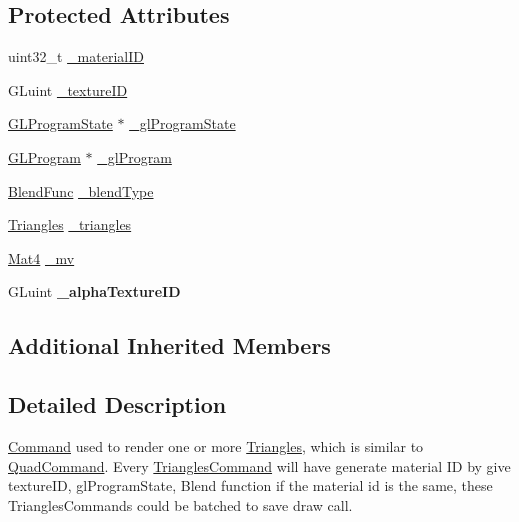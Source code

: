 \subsection*{Protected Attributes}
\begin{DoxyCompactItemize}
\item 
uint32\+\_\+t \hyperlink{classTrianglesCommand_a3f477ae91549ae4a58396ce892d79021}{\+\_\+material\+ID}
\item 
G\+Luint \hyperlink{classTrianglesCommand_ac3a181c96ba458f8d476b4f35266503a}{\+\_\+texture\+ID}
\item 
\hyperlink{classGLProgramState}{G\+L\+Program\+State} $\ast$ \hyperlink{classTrianglesCommand_a204f411f00ac6449b4540a9789c0956e}{\+\_\+gl\+Program\+State}
\item 
\hyperlink{classGLProgram}{G\+L\+Program} $\ast$ \hyperlink{classTrianglesCommand_aeea0d1064dcd2abdee34cd1673956188}{\+\_\+gl\+Program}
\item 
\hyperlink{structBlendFunc}{Blend\+Func} \hyperlink{classTrianglesCommand_abed08224f3a8d837e6fb2a37c2c1d786}{\+\_\+blend\+Type}
\item 
\hyperlink{structTrianglesCommand_1_1Triangles}{Triangles} \hyperlink{classTrianglesCommand_a601af16a4f1f67e7cf220c5753884ae1}{\+\_\+triangles}
\item 
\hyperlink{classMat4}{Mat4} \hyperlink{classTrianglesCommand_a0cfaec95be0eeb82f24db61f18c3d818}{\+\_\+mv}
\item 
\mbox{\label{classTrianglesCommand_a674f75ea88df7f3a38eb248d4e3c2ddb}} 
G\+Luint {\bfseries \+\_\+alpha\+Texture\+ID}
\end{DoxyCompactItemize}
\subsection*{Additional Inherited Members}


\subsection{Detailed Description}
\hyperlink{classCommand}{Command} used to render one or more \hyperlink{structTrianglesCommand_1_1Triangles}{Triangles}, which is similar to \hyperlink{classQuadCommand}{Quad\+Command}. Every \hyperlink{classTrianglesCommand}{Triangles\+Command} will have generate material ID by give texture\+ID, gl\+Program\+State, Blend function if the material id is the same, these Triangles\+Commands could be batched to save draw call. 


